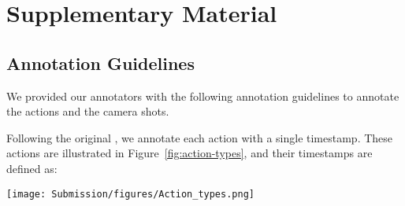 \documentclass[final]{cvsports}
\begin{document}
\clearpage 

\newpage 
\section{Supplementary Material}

\subsection{Annotation Guidelines}

We provided our annotators with the following annotation guidelines to annotate the actions and the camera shots. 

 Following the original \SoccerNet, we annotate each action with a single timestamp. These actions are illustrated in Figure~\ref{fig:action-types}, and their timestamps are defined as:


\begin{figure*}
    \centering
    \texttt{[image: Submission/figures/Action\_types.png]}
    \caption{\textbf{Actions.} An example of each action identified in SoccerNet-v2.}
    \label{fig:action-types}
\end{figure*}
\end{document}
